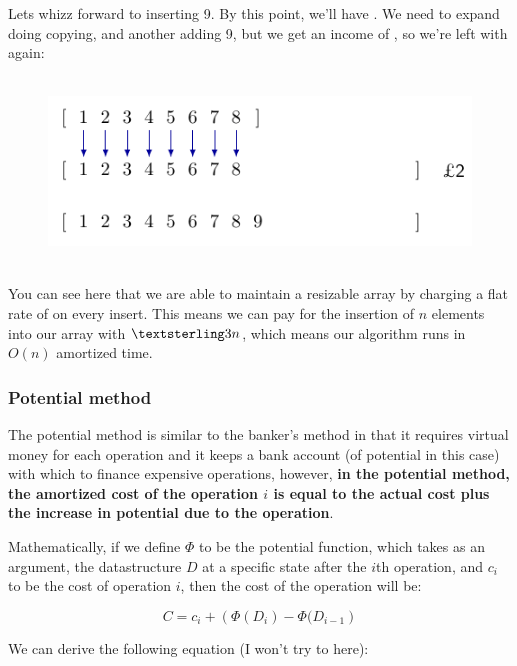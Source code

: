 Lets whizz forward to inserting 9. By this point, we'll have .
We need to expand  doing copying, and another adding 9, but we
get an income of , so we're left with  again:

\begin{figure}[H]
  \centering
  \includegraphics[height=50mm]{diagrams/banker9.pdf}
  \label{banker9}
\end{figure}

You can see here that we are able to maintain a resizable array by charging a
flat rate of  on every insert. This means we can pay for the
insertion of $n$ elements into our array with $\textsterling 3n$, which means
our algorithm runs in $O(n)$ amortized time.

\subsubsection{Potential method}


The potential method is similar to the banker's method in that it requires
virtual money for each operation and it keeps a bank account (of potential in
this case) with which to finance expensive operations, however, \textbf{in the
potential method, the amortized cost of the operation $i$ is equal to the actual
cost plus the increase in potential due to the operation}.

Mathematically, if we define $\Phi$ to be the potential function, which takes as
an argument, the datastructure $D$ at a specific state after the $i$th
operation, and $c_i$ to be the cost of operation $i$, then the cost of the
operation will be:

\[
  C = c_i + \left(\Phi(D_i) - \Phi(D_{i-1}\right)
\]

We can derive the following equation (I won't try to here):

